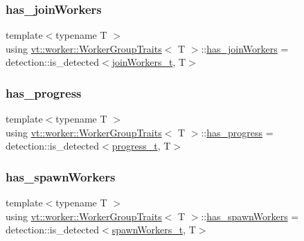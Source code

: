 \subsubsection{\texorpdfstring{has\+\_\+join\+Workers}{has\_joinWorkers}}
{\footnotesize\ttfamily template$<$typename T $>$ \\
using \hyperlink{structvt_1_1worker_1_1_worker_group_traits}{vt\+::worker\+::\+Worker\+Group\+Traits}$<$ T $>$\+::\hyperlink{structvt_1_1worker_1_1_worker_group_traits_a1341eeadf82a951575948a73e0dfbe71}{has\+\_\+join\+Workers} =  detection\+::is\+\_\+detected$<$\hyperlink{structvt_1_1worker_1_1_worker_group_traits_a002c86e937f3022ee8320ec1d9eb488b}{join\+Workers\+\_\+t}, T$>$}

\mbox{\label{structvt_1_1worker_1_1_worker_group_traits_a53b49db498da05de17fea98afe4e6677}} 
\subsubsection{\texorpdfstring{has\+\_\+progress}{has\_progress}}
{\footnotesize\ttfamily template$<$typename T $>$ \\
using \hyperlink{structvt_1_1worker_1_1_worker_group_traits}{vt\+::worker\+::\+Worker\+Group\+Traits}$<$ T $>$\+::\hyperlink{structvt_1_1worker_1_1_worker_group_traits_a53b49db498da05de17fea98afe4e6677}{has\+\_\+progress} =  detection\+::is\+\_\+detected$<$\hyperlink{structvt_1_1worker_1_1_worker_group_traits_ae36a285568af422079494454bd4bdeae}{progress\+\_\+t}, T$>$}

\mbox{\label{structvt_1_1worker_1_1_worker_group_traits_a991fbf48784303601281452f8d3c53c8}} 
\subsubsection{\texorpdfstring{has\+\_\+spawn\+Workers}{has\_spawnWorkers}}
{\footnotesize\ttfamily template$<$typename T $>$ \\
using \hyperlink{structvt_1_1worker_1_1_worker_group_traits}{vt\+::worker\+::\+Worker\+Group\+Traits}$<$ T $>$\+::\hyperlink{structvt_1_1worker_1_1_worker_group_traits_a991fbf48784303601281452f8d3c53c8}{has\+\_\+spawn\+Workers} =  detection\+::is\+\_\+detected$<$\hyperlink{structvt_1_1worker_1_1_worker_group_traits_a9a4aa1adc4280b6689a7c0212eca4577}{spawn\+Workers\+\_\+t}, T$>$}

